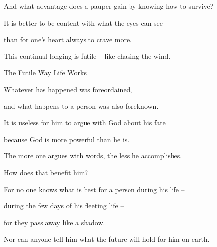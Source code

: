 {\par }{\Q And what
advantage does a pauper
gain by knowing how
to survive?
\par }{\Q {}It is better
to be content with what the eyes
can see
\par }{\Q than
for one’s heart
always to crave
more.

\par }{\Q This
continual longing is futile
– like chasing
the wind.
\par }{\SH The Futile Way Life Works
\par }{\Q {}Whatever
has happened
was foreordained,
\par }{\Q and what happens to a person
was
also
foreknown.
\par }{\Q It is useless for him to argue with
God about his fate
\par }{\Q because God is more
powerful than he is.
\par }{\Q {}The more one
argues with words,
the less he accomplishes.
\par }{\Q How
does that benefit him?
\par }{\Q {}For
no one
knows
what
is best
for a person
during his life –
\par }{\Q during the few
days
of his fleeting
life –
\par }{\Q for they pass away like a shadow.
\par }{\Q Nor can anyone tell him what the future will hold for him on earth.

}
